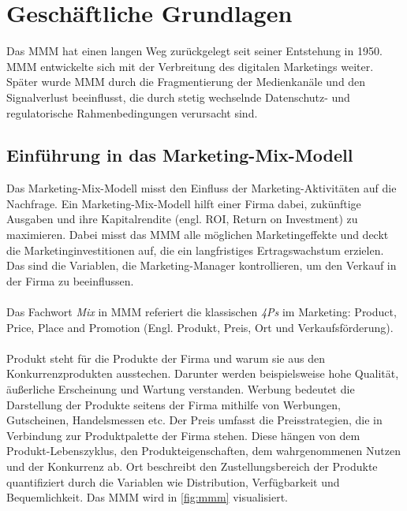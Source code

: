 \newpage
\section{Geschäftliche Grundlagen}
\label{GeschäftlicheGrundlagen}
Das \ac{MMM} hat einen langen Weg zurückgelegt seit seiner Entstehung in 1950. \ac{MMM} entwickelte sich mit der Verbreitung des digitalen Marketings weiter. Später wurde \ac{MMM} durch die Fragmentierung der Medienkanäle und den Signalverlust beeinflusst, die durch stetig wechselnde Datenschutz- und regulatorische Rahmenbedingungen verursacht sind\cite{MMMdef}.
\subsection{Einführung in das Marketing-Mix-Modell}
\label{EinführungInDasMMM}
Das Marketing-Mix-Modell misst den Einfluss der Marketing-Aktivitäten auf die Nachfrage. Ein Marketing-Mix-Modell hilft einer Firma dabei, zukünftige Ausgaben und ihre Kapitalrendite (engl. \ac{ROI}, Return on Investment) zu maximieren. Dabei misst das \ac{MMM} alle möglichen Marketingeffekte und deckt die Marketinginvestitionen auf, die ein langfristiges Ertragswachstum erzielen. Das sind die Variablen, die Marketing-Manager kontrollieren, um den Verkauf in der Firma zu beeinflussen. \\\\Das Fachwort \textit{Mix} in \ac{MMM} referiert die klassischen \textit{4Ps} im Marketing: Product, Price, Place and Promotion (Engl. Produkt, Preis, Ort und Verkaufsförderung)\cite[S. 109 ff]{akinkunmi2018data}. \\\\
Produkt steht für die Produkte der Firma und warum sie aus den Konkurrenzprodukten ausstechen. Darunter werden beispielsweise hohe Qualität, äußerliche Erscheinung und Wartung verstanden. Werbung bedeutet die Darstellung der Produkte seitens der Firma mithilfe von Werbungen, Gutscheinen, Handelsmessen etc. Der Preis umfasst die Preisstrategien, die in Verbindung zur Produktpalette der Firma stehen. Diese hängen von dem Produkt-Lebenszyklus, den Produkteigenschaften, dem wahrgenommenen Nutzen und der Konkurrenz ab. Ort beschreibt den Zustellungsbereich der Produkte quantifiziert durch die Variablen wie Distribution, Verfügbarkeit und Bequemlichkeit\cite{akinkunmi2018data}. Das \ac{MMM} wird in \autoref{fig:mmm} visualisiert. \\\\ 
